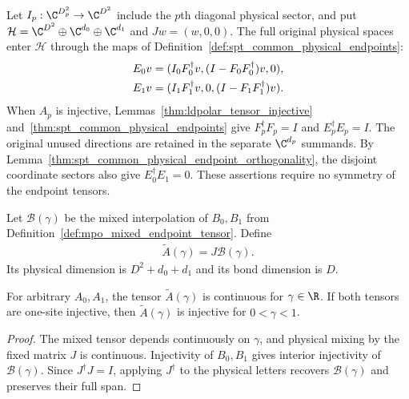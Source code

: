 Let $I_p:\C^{D_p^2}\to\C^{D^2}$ include the $p$th diagonal
physical sector, and put
$\mathcal H=\C^{D^2}\oplus\C^{d_0}\oplus\C^{d_1}$ and
$Jw=(w,0,0)$. The full original physical spaces enter $\mathcal H$
through the maps of Definition~\ref{def:spt_common_physical_endpoints}:
\begin{align}
    E_0v & =(I_0F_0^\dagger v,(I-F_0F_0^\dagger)v,0),\notag \\
    E_1v & =(I_1F_1^\dagger v,0,(I-F_1F_1^\dagger)v).
    \label{eq:mpo_arbitrary_full_embeddings}
\end{align}
When $A_p$ is injective, Lemmas~\ref{thm:ldpolar_tensor_injective}
and~\ref{thm:spt_common_physical_endpoints} give
$F_p^\dagger F_p=I$ and $E_p^\dagger E_p=I$.
The original unused directions are retained in the separate
$\C^{d_p}$ summands. By
Lemma~\ref{thm:spt_common_physical_endpoint_orthogonality}, the disjoint
coordinate sectors also give $E_0^\dagger E_1=0$.
These assertions require no symmetry of the endpoint tensors.

\begin{definition}
    \label{def:mpo_arbitrary_physical_tensor}
    \leanok
    Let $\mathcal B(\gamma)$ be the mixed interpolation of $B_0,B_1$
    from Definition~\ref{def:mpo_mixed_endpoint_tensor}. Define
    \begin{align}
        \widetilde A(\gamma)=J\mathcal B(\gamma).
        \label{eq:mpo_arbitrary_tensor}
    \end{align}
    Its physical dimension is $D^2+d_0+d_1$ and its bond dimension is $D$.
\end{definition}

\begin{lemma}
    \label{thm:mpo_arbitrary_tensor_continuity}
    \leanok
    For arbitrary $A_0,A_1$, the tensor $\widetilde A(\gamma)$ is
    continuous for $\gamma\in\R$. If both tensors are one-site
    injective, then $\widetilde A(\gamma)$ is injective for
    $0<\gamma<1$.
\end{lemma}
\begin{proof}\leanok
    The mixed tensor depends continuously on $\gamma$, and physical
    mixing by the fixed matrix $J$ is continuous. Injectivity of
    $B_0,B_1$ gives interior injectivity of $\mathcal B(\gamma)$.
    Since $J^\dagger J=I$, applying $J^\dagger$ to the physical
    letters recovers $\mathcal B(\gamma)$ and preserves their full span.
\end{proof}

